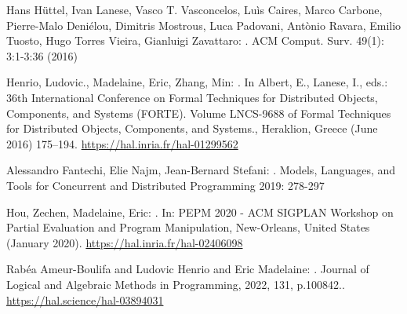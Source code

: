 \documentclass[11pt,fleqn]{article}
\begin{document}
\begin{thebibliography}{9}

Hans H\"uttel, Ivan Lanese, Vasco T. Vasconcelos, Lu\`is Caires, Marco Carbone, Pierre-Malo Deni\'elou, Dimitris Mostrous, Luca Padovani, Ant\`onio Ravara, Emilio Tuosto, Hugo Torres Vieira, Gianluigi Zavattaro:
.
\newblock ACM Comput. Surv. 49(1): 3:1-3:36 (2016)



Henrio, Ludovic., Madelaine, Eric, Zhang, Min:
.
\newblock In Albert, E., Lanese, I., eds.: {36th International Conference on
  Formal Techniques for Distributed Objects, Components, and Systems (FORTE)}.
  Volume LNCS-9688 of Formal Techniques for Distributed Objects, Components,
  and Systems., Heraklion, Greece (June 2016)  175--194. 
\newblock  \url{https://hal.inria.fr/hal-01299562}

Alessandro Fantechi, Elie Najm, Jean-Bernard Stefani:
.
\newblock Models, Languages, and Tools for Concurrent and Distributed Programming 2019: 278-297



Hou, Zechen, Madelaine, Eric:
.
\newblock In: {PEPM 2020 - ACM SIGPLAN Workshop on Partial Evaluation and
  Program Manipulation}, New-Orleans, United States (January 2020). 
 \newblock \url{https://hal.inria.fr/hal-02406098}

Rabéa Ameur-Boulifa and Ludovic Henrio and Eric Madelaine:
.
\newblock Journal of Logical and Algebraic Methods in Programming, 2022, 131, p.100842..
 \newblock \url{https://hal.science/hal-03894031}
\end{thebibliography}
\end{document}
